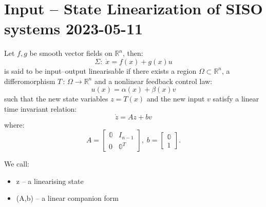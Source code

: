 
\chapter{Input -- State Linearization of SISO systems 2023-05-11}

{
    Let $f, g$ be smooth vector fields on $\mathbb{R}^{n}$, then:
     \begin{equation}
        \Sigma:\; \dot{x} = f(x) + g(x)u
    \end{equation}
    is said to be input--output linearisable if there exists a region $\Omega \subset \mathbb{R}^{n}$,
    a differomorphism $T\,:\,\Omega \longrightarrow \mathbb{R}^{n} $ and a nonlinear feedback
    control law:
    \begin{equation}
        u(x) = \alpha(x) + \beta(x)v
    \end{equation}
    such that the new state variables $z = T(x)$  and the new input $v$ satisfy
    a linear time invariant relation:
     \begin{equation}
        \dot{z} = Az + bv
    \end{equation}
    where:
    \[
    A = \begin{bmatrix}
        \mathbb{0} & I_{n-1}  \\
        0 & \mathbb{0}^{T}
    \end{bmatrix},\; b = \begin{bmatrix}
        \mathbb{0}  \\
        1
    \end{bmatrix}
    .\] 

    \nt
    {
        We call:
        \begin{itemize}
                \item z -- a linearising state
                \item (A,b) -- a linear companion form
                
        \end{itemize}
    }

}

